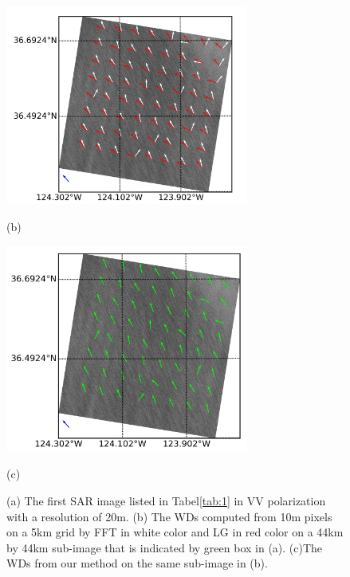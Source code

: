 \documentclass{article}
\begin{document}
\begin{figure}[tpb]
\begin{spacing}{0.3}
\end{spacing}
\begin{minipage}[b]{0.48\linewidth}
  \centering
  \centerline{\includegraphics[width=8cm]{1_wind_5.png}}
  \centerline{(b)}\medskip
\end{minipage}
\begin{spacing}{0.3}
\end{spacing}
\begin{minipage}[b]{0.48\linewidth}
  \centering
  \centerline{\includegraphics[width=8cm]{1_wind_m_5.png}}
  \centerline{(c)}\medskip
\end{minipage}
\setlength{\abovecaptionskip}{9pt}
\caption{(a) The first SAR image listed in Tabel\ref{tab:1} in VV polarization with a resolution of 20m. (b) The WDs computed from 10m pixels on a 5km grid by FFT in white color and LG in red color on a 44km by 44km sub-image that is indicated by green box in (a). (c)The WDs from our method on the same sub-image in (b).}
\label{fig:1}
\end{figure}
\end{document}
